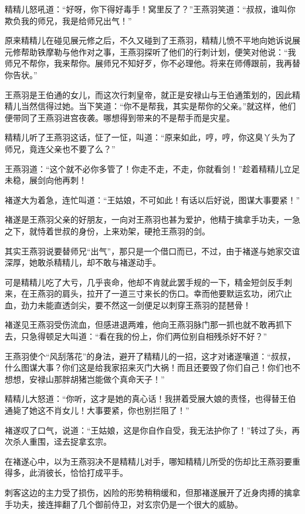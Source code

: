 \documentclass[12pt,oneside]{book}
\begin{document}
精精儿怒吼道：``好呀，你下得好毒手！窝里反了？''王燕羽笑道：``叔叔，谁叫你欺负我的师兄，我是给师兄出气！''

原来精精儿在碰见展元修之后，不久又碰到了王燕羽，精精儿愤不平地向她诉说展元修帮助铁摩勒与他作对之事，王燕羽探听了他们的行刺计划，便笑对他说：``我师兄不帮你，我来帮你。展师兄不知好歹，你不必理他。将来在师傅跟前，我再替你告状。''

王燕羽是王伯通的女儿，而这次行刺皇帝，就正是安禄山与王伯通策划的，因此精精儿当然信得过她。当下笑道：``你不是帮我，其实是帮你的父亲。''就这样，他们便带同了王燕羽进宫夜袭。哪想得到带来的不是帮手而是灾星。

精精儿听了王燕羽这话，怔了一怔，叫道：``原来如此，哼，哼，你这臭丫头为了师兄，竟连父亲也不要了么？''

王燕羽道：``这个就不必你多管了！你走不走，不走，你就看剑！''趁着精精儿立足未稳，展剑向他再刺！

褚遂大为着急，连忙叫道：``王姑娘，不可如此！有话以后好说，图谋大事要紧！''

褚遂是王燕羽父亲的好朋友，一向对王燕羽也甚为爱护，他精于擒拿手功夫，一急之下，就恃着世叔的身份，上来劝架，硬抢王燕羽的剑。

其实王燕羽说要替师兄``出气''，那只是一个借口而已，不过，由于褚遂与她家交谊深厚，她敢杀精精儿，却不敢与褚遂动手。

可是精精儿吃了大亏，几乎丧命，他却不肯就此罢手规的一下，精金短剑反手刺来，在王燕羽的肩头，拉开了一道三寸来长的伤口。幸而他要默运玄功，闭穴止血，劲力未能直透剑尖，要不然这一剑便足以刺穿王燕羽的琵琶骨！

褚遂见王燕羽受伤流血，但感进退两难，他向王燕羽脉门那一抓也就不敢再抓下去，只急得顿足大叫道：``看在我的份上，你们两位别自相残杀好不好？''

王燕羽使个``风刮落花''的身法，避开了精精儿的一招，这才对诸遂嚷道：``叔叔，什么图谋大事？你们这是给我家招来灭门大祸！而且还要毁了你们自己！你们也不想想，安禄山那胖胡猪岂能做个真命天子！''

精精儿大怒道：``你听，这才是她的真心话！我拼着受展大娘的责怪，也得替王伯通毙了她这不肖女儿！大事要紧，你也别拦阻了！''

褚遂叹了口气，说道：``王姑娘，这是你自作自受，我无法护你了！''转过了头，再次杀人重围，迳去捉拿玄宗。

在褚遂心中，以为王燕羽决不是精精儿对手，哪知精精儿所受的伤却比王燕羽要重得多，此消彼长，恰恰打成平手。

刺客这边的主力受了损伤，凶险的形势稍稍缓和，但那褚遂展开了近身肉搏的擒拿手功夫，接连摔翻了几个御前侍卫，对玄宗仍是一个很大的威胁。
\end{document}
